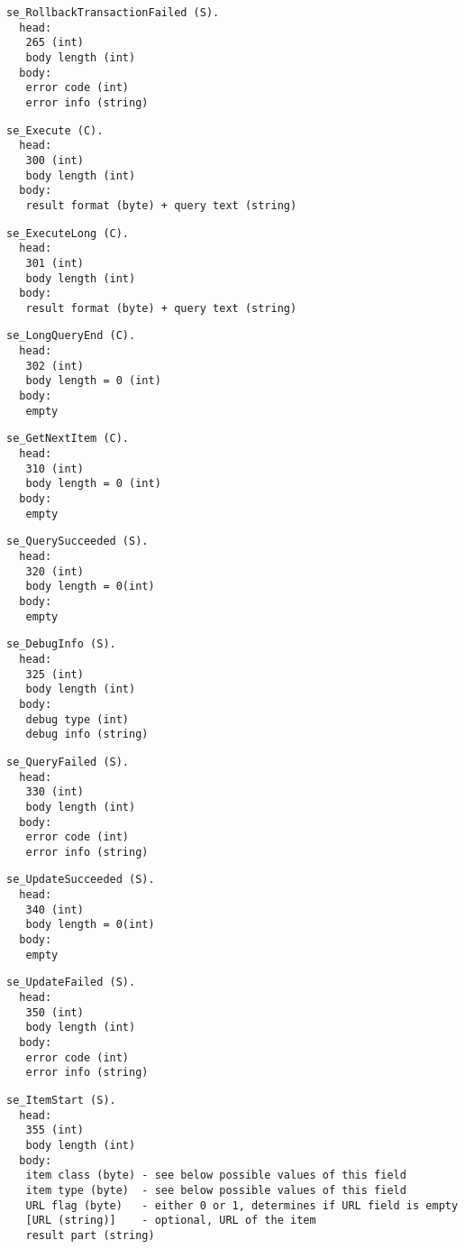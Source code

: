 \documentclass[a4paper,12pt]{article}
\begin{document}
\begin{verbatim}
se_RollbackTransactionFailed (S).
  head:
   265 (int)
   body length (int)
  body:
   error code (int)
   error info (string)
\end{verbatim}

\begin{verbatim}
se_Execute (C).
  head:
   300 (int)
   body length (int)
  body:
   result format (byte) + query text (string)
\end{verbatim}

\begin{verbatim}
se_ExecuteLong (C).
  head:
   301 (int)
   body length (int)
  body:
   result format (byte) + query text (string)
\end{verbatim}

\begin{verbatim}
se_LongQueryEnd (C).
  head:
   302 (int)
   body length = 0 (int)
  body:
   empty
\end{verbatim}

\begin{verbatim}
se_GetNextItem (C).
  head:
   310 (int)
   body length = 0 (int)
  body:
   empty
\end{verbatim}

\begin{verbatim}
se_QuerySucceeded (S).
  head:
   320 (int)
   body length = 0(int)
  body:
   empty
\end{verbatim}

\begin{verbatim}
se_DebugInfo (S).
  head:
   325 (int)
   body length (int)
  body:
   debug type (int)
   debug info (string)
\end{verbatim}

\begin{verbatim}
se_QueryFailed (S).
  head:
   330 (int)
   body length (int)
  body:
   error code (int)
   error info (string)
\end{verbatim}

\begin{verbatim}
se_UpdateSucceeded (S).
  head:
   340 (int)
   body length = 0(int)
  body:
   empty
\end{verbatim}

\begin{verbatim}
se_UpdateFailed (S).
  head:
   350 (int)
   body length (int)
  body:
   error code (int)
   error info (string)
\end{verbatim}

\begin{verbatim}
se_ItemStart (S).
  head:
   355 (int)
   body length (int)
  body:
   item class (byte) - see below possible values of this field
   item type (byte)  - see below possible values of this field
   URL flag (byte)   - either 0 or 1, determines if URL field is empty
   [URL (string)]    - optional, URL of the item
   result part (string)
\end{verbatim}
\end{document}
